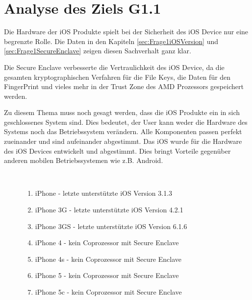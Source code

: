 \section{Analyse des Ziels G1.1}
\label{sec:AnalyseG11}
 Die Hardware der iOS Produkte spielt bei der Sicherheit des iOS Device nur eine begrenzte Rolle. Die Daten in den Kapiteln \ref{sec:Frage1iOSVersion} und \ref{sec:Frage1SecureEnclave} zeigen diesen Sachverhalt ganz klar.\par  
Die Secure Enclave verbesserte die Vertraulichkeit des iOS Device, da die gesamten kryptographischen Verfahren für die File Keys, die Daten für den FingerPrint und vieles mehr in der Trust Zone des AMD Prozessors gespeichert werden. \par
Zu diesem Thema muss noch gesagt werden, dass die iOS Produkte ein in sich geschlossenes System sind. Dies bedeutet, der User kann weder die Hardware des Systems noch das Betriebssystem verändern. Alle Komponenten passen perfekt zueinander und sind aufeinander abgestimmt. Das iOS wurde für die Hardware des iOS Devices entwickelt und abgestimmt. Dies bringt Vorteile gegenüber anderen mobilen Betriebssystemen wie z.B. Android.  

\begin{description}
    \item[\parbox{\textwidth} {Zum heutigen Zeitpunkt sind drei iOS Devices als nicht sicher einzustufen}]~\par
    \begin{enumerate}
        \item iPhone - letzte unterstützte iOS Version 3.1.3
        \item iPhone 3G - letzte unterstützte iOS Version 4.2.1
        \item iPhone 3GS - letzte unterstützte iOS Version 6.1.6
        \item iPhone 4 - kein Coprozessor mit Secure Enclave
        \item iPhone 4s - kein Coprozessor mit Secure Enclave
        \item iPhone 5 - kein Coprozessor mit Secure Enclave
        \item iPhone 5c - kein Coprozessor mit Secure Enclave
    \end{enumerate}
\end{description} 
 
